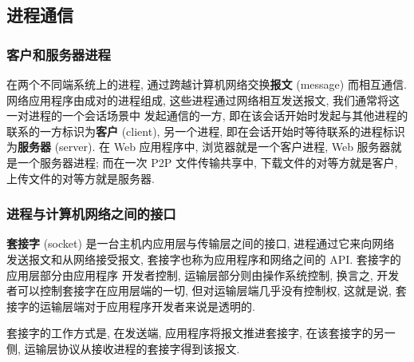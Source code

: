 \documentclass[10pt,UTF8]{book} %
\begin{document}
\subsection{进程通信}

\subsubsection{客户和服务器进程}

在两个不同端系统上的进程, 通过跨越计算机网络交换\textbf{报文} (message) 而相互通信.
网络应用程序由成对的进程组成, 这些进程通过网络相互发送报文, 我们通常将这一对进程的一个会话场景中
{\kaishu 发起通信的一方, 即在该会话开始时发起与其他进程的联系的一方标识为\textbf{客户} (client),
另一个进程, 即在会话开始时等待联系的进程标识为\textbf{服务器} (server)}.
在 Web 应用程序中, 浏览器就是一个客户进程, Web 服务器就是一个服务器进程; 而在一次 P2P
文件传输共享中, 下载文件的对等方就是客户, 上传文件的对等方就是服务器.

\subsubsection{进程与计算机网络之间的接口}

\textbf{套接字} (socket) 是一台主机内应用层与传输层之间的接口, 进程通过它来向网络
发送报文和从网络接受报文, 套接字也称为应用程序和网络之间的 API. 套接字的应用层部分由应用程序
开发者控制, 运输层部分则由操作系统控制, 换言之, 开发者可以控制套接字在应用层端的一切,
但对运输层端几乎没有控制权, 这就是说, 套接字的运输层端对于应用程序开发者来说是透明的.

套接字的工作方式是, 在发送端, 应用程序将报文推进套接字, 在该套接字的另一侧,
运输层协议从接收进程的套接字得到该报文.
\end{document}
